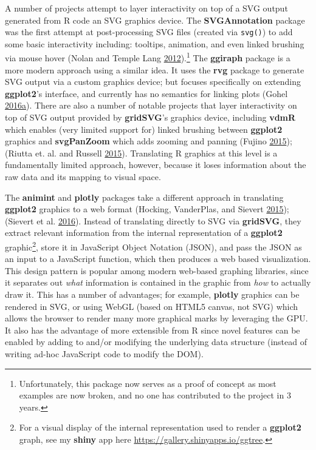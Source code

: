\documentclass[12pt,]{isuthesis}
\let\rmarkdownfootnote\footnote%
\def\footnote{\protect\rmarkdownfootnote}
\begin{document}
A number of projects attempt to layer interactivity on top of a SVG
output generated from R code an SVG graphics device. The
\textbf{SVGAnnotation} package was the first attempt at post-processing
SVG files (created via \texttt{svg()}) to add some basic interactivity
including: tooltips, animation, and even linked brushing via mouse hover
(Nolan and Temple Lang
\protect\hyperlink{ref-SVGAnnotation}{2012}).\footnote{Unfortunately,
  this package now serves as a proof of concept as most examples are now
  broken, and no one has contributed to the project in 3 years.} The
\textbf{ggiraph} package is a more modern approach using a similar idea.
It uses the \textbf{rvg} package to generate SVG output via a custom
graphics device; but focuses specifically on extending
\textbf{ggplot2}'s interface, and currently has no semantics for linking
plots (Gohel
\protect\hyperlink{ref-ggiraph}{2016}\protect\hyperlink{ref-ggiraph}{a}).
There are also a number of notable projects that layer interactivity on
top of SVG output provided by \textbf{gridSVG}'s graphics device,
including \textbf{vdmR} which enables (very limited support for) linked
brushing between \textbf{ggplot2} graphics and \textbf{svgPanZoom} which
adds zooming and panning (Fujino \protect\hyperlink{ref-vdmR}{2015});
(Riutta et. al. and Russell \protect\hyperlink{ref-svgPanZoom}{2015}).
Translating R graphics at this level is a fundamentally limited
approach, however, because it loses information about the raw data and
its mapping to visual space.

The \textbf{animint} and \textbf{plotly} packages take a different
approach in translating \textbf{ggplot2} graphics to a web format
(Hocking, VanderPlas, and Sievert
\protect\hyperlink{ref-animint}{2015}); (Sievert et al.
\protect\hyperlink{ref-plotly}{2016}). Instead of translating directly
to SVG via \textbf{gridSVG}, they extract relevant information from the
internal representation of a \textbf{ggplot2} graphic\footnote{For a
  visual display of the internal representation used to render a
  \textbf{ggplot2} graph, see my \textbf{shiny} app here
  \url{https://gallery.shinyapps.io/ggtree}.}, store it in JavaScript
Object Notation (JSON), and pass the JSON as an input to a JavaScript
function, which then produces a web based visualization. This design
pattern is popular among modern web-based graphing libraries, since it
separates out \emph{what} information is contained in the graphic from
\emph{how} to actually draw it. This has a number of advantages; for
example, \textbf{plotly} graphics can be rendered in SVG, or using WebGL
(based on HTML5 canvas, not SVG) which allows the browser to render many
more graphical marks by leveraging the GPU. It also has the advantage of
more extensible from R since novel features can be enabled by adding to
and/or modifying the underlying data structure (instead of writing
ad-hoc JavaScript code to modify the DOM).
\end{document}

